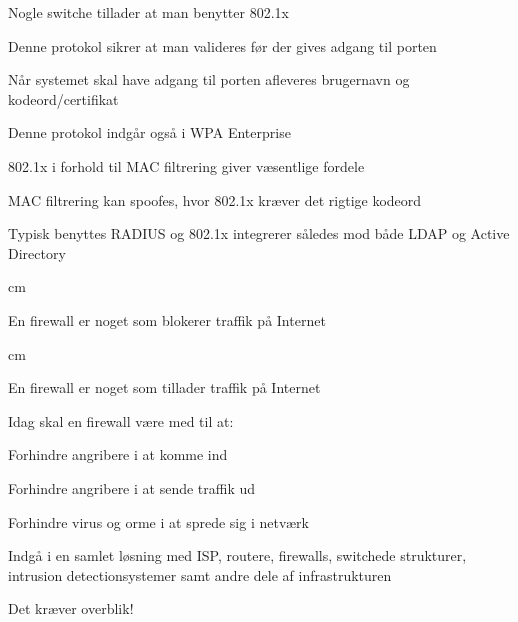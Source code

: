 \documentclass[Screen16to9,17pt]{foils}
\begin{document}


\begin{list1}
\item Nogle switche tillader at man benytter 802.1x
\item Denne protokol sikrer at man valideres før der gives adgang til porten
\item Når systemet skal have adgang til porten afleveres brugernavn og kodeord/certifikat
\item Denne protokol indgår også i WPA Enterprise
\end{list1}



\begin{list1}
\item 802.1x i forhold til MAC filtrering giver væsentlige fordele
\item MAC filtrering kan spoofes, hvor 802.1x kræver det rigtige kodeord
\item Typisk benyttes RADIUS og 802.1x integrerer således mod både LDAP og Active Directory
\end{list1}














 cm
\centerline{\hlkbig En firewall er noget som {\color{green}blokerer}
  traffik på Internet}

 cm
\pause

\centerline{\hlkbig En firewall er noget som {\color{red}tillader}
  traffik på Internet}


\begin{list1}
\item Idag skal en firewall være med til at:
\begin{list2}
\item Forhindre angribere i at komme ind
\item Forhindre angribere i at sende traffik ud
\item Forhindre virus og orme i at sprede sig i netværk
\item Indgå i en samlet løsning med ISP, routere, firewalls, switchede
  strukturer, intrusion detectionsystemer samt andre dele af infrastrukturen
\end{list2}
\item Det kræver overblik!
\end{list1}
\end{document}
